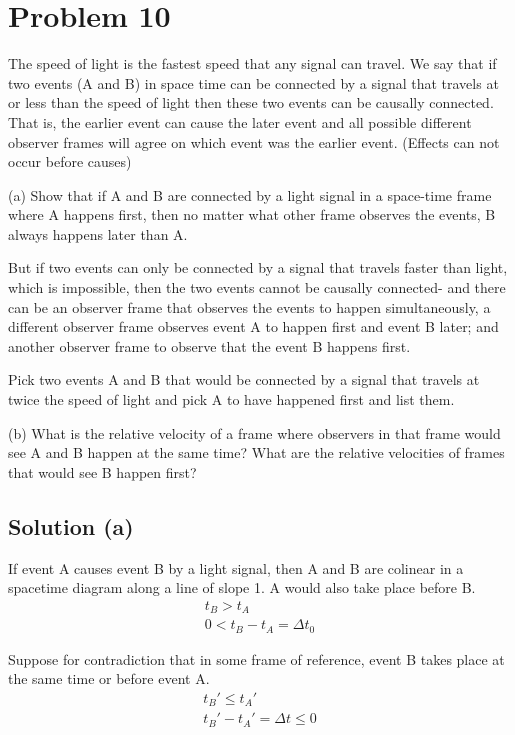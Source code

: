 \documentclass[12pt]{report}
\begin{document}
\section*{Problem 10}
    The speed of light is the fastest speed that any signal can travel. 
    We say that if two events (A and B) in space time can be connected by a signal that travels at or less than the speed of light then these two events can be causally connected. 
    That is, the earlier event can cause the later event and all possible different observer frames will agree on which event was the earlier event. 
    (Effects can not occur before causes)
    
    (a) Show that if A and B are connected by a light signal in a space-time frame where A happens first, then no matter what other frame observes the events, B always happens later than A.

    But if two events can only be connected by a signal that travels faster than light, which is impossible, then the two events cannot be causally connected- and there can be an observer frame that observes the events to happen simultaneously, a different observer frame observes event A to happen first and event B later; and another observer frame to observe that the event B happens first.

    Pick two events A and B that would be connected by a signal that travels at twice the speed of light and pick A to have happened first and list them.

    (b) What is the relative velocity of a frame where observers in that frame would see A and B happen at the same time?
    What are the relative velocities of frames that would see B happen first?

    \subsection*{Solution (a)}
        If event A causes event B by a light signal, then A and B are colinear in a spacetime diagram along a line of slope 1.
        A would also take place before B. 
        \begin{gather*}
            t_B > t_A\\
            0 < t_B - t_A = \Delta t_0
        \end{gather*}

        Suppose for contradiction that in some frame of reference, event B takes place at the same time or before event A.
        \begin{gather*}
            t_B' \leq t_A'\\
            t_B' - t_A' = \Delta t \leq 0
        \end{gather*}
\end{document}
